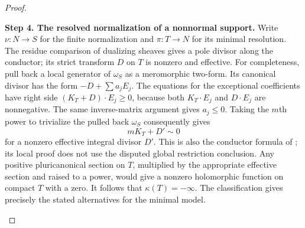 \begin{proof}
\begin{enumerate}[label={$\langle1\rangle$\arabic*.},leftmargin=*]
\noindent\textbf{Step 4. The resolved normalization of a nonnormal support.}
Write $\nu:N\to S$ for the finite normalization and $\pi:T\to N$
for its minimal resolution. The residue comparison of dualizing
sheaves gives a pole divisor along the conductor; its strict
transform $D$ on $T$ is nonzero and effective. For completeness,
pull back a local generator of $\omega_S$ as a meromorphic
two-form. Its canonical divisor has the form $-D+\sum a_jE_j$.
The equations for the exceptional coefficients have right side
$(K_T+D)\cdot E_j\ge0$, because both $K_T\cdot E_j$ and
$D\cdot E_j$ are nonnegative. The same inverse-matrix argument
gives $a_j\le0$. Taking the $m$th power to trivialize the pulled
back $\omega_S$ consequently gives
\[
 mK_T+D'\sim0
\]
for a nonzero effective integral divisor $D'$. This is also the
conductor formula of \cite[Lemma~4.6, p.~7 of the attached-source edition]{CDP20}; its local proof does
not use the disputed global restriction conclusion. Any
positive pluricanonical section on $T$, multiplied by the
appropriate effective section and raised to a power, would give
a nonzero holomorphic function on compact $T$ with a zero.
It follows that $\kappa(T)=-\infty$. The classification \cite[Chapter~VI, Theorem~1.1, p.~243]{BHPV2004E}
gives precisely the stated alternatives for the minimal model.

\end{enumerate}
\end{proof}
